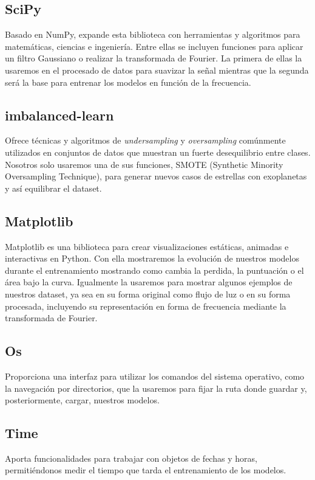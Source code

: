 \subsection{SciPy}
Basado en NumPy, expande esta biblioteca con herramientas y algoritmos para matemáticas, ciencias e ingeniería. Entre ellas se incluyen funciones para aplicar un filtro Gaussiano o realizar la transformada de Fourier. La primera de ellas la usaremos en el procesado de datos para suavizar la señal mientras que la segunda será la base para entrenar los modelos en función de la frecuencia.

\subsection{imbalanced-learn}
Ofrece técnicas y algoritmos de \textit{undersampling} y \textit{oversampling} comúnmente utilizados en conjuntos de datos que muestran un fuerte desequilibrio entre clases. Nosotros solo usaremos una de sus funciones, SMOTE (Synthetic Minority Oversampling Technique), para generar nuevos casos de estrellas con exoplanetas y así equilibrar el dataset.

\subsection{Matplotlib}
Matplotlib es una biblioteca para crear visualizaciones estáticas, animadas e interactivas en Python. Con ella mostraremos la evolución de nuestros modelos durante el entrenamiento mostrando como cambia la perdida, la puntuación o el área bajo la curva. Igualmente la usaremos para mostrar algunos ejemplos de nuestros dataset, ya sea en su forma original como flujo de luz o en su forma procesada, incluyendo su representación en forma de frecuencia mediante la transformada de Fourier.

\subsection{Os}
Proporciona una interfaz para utilizar los comandos del sistema operativo, como la navegación por directorios, que la usaremos para fijar la ruta donde guardar y, posteriormente, cargar, nuestros modelos.

\subsection{Time}
Aporta funcionalidades para trabajar con objetos de fechas y horas, permitiéndonos medir el tiempo que tarda el entrenamiento de los modelos.

